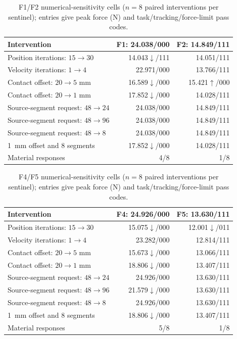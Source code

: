 \begin{table}[t]
\centering
\caption{F1/F2 numerical-sensitivity cells ($n=8$ paired interventions per
sentinel); entries give peak force (N) and task/tracking/force-limit pass codes.}
\label{tab:numerical_cells_f1_f2}
\scriptsize
\setlength{\tabcolsep}{3.2pt}
\renewcommand{\arraystretch}{0.90}
\begin{tabular}{@{}lrr@{}}
\toprule
Intervention & F1: 24.038/000 & F2: 14.849/111 \\
\midrule
Position iterations: $15\rightarrow30$ & 14.043$\downarrow$/111 & 14.051/111 \\
Velocity iterations: $1\rightarrow4$ & 22.971/000 & 13.766/111 \\
Contact offset: $20\rightarrow5$ mm & 16.589$\downarrow$/000 & 15.421$\uparrow$/000 \\
Contact offset: $20\rightarrow1$ mm & 17.852$\downarrow$/000 & 14.028/111 \\
Source-segment request: $48\rightarrow24$ & 24.038/000 & 14.849/111 \\
Source-segment request: $48\rightarrow96$ & 24.038/000 & 14.849/111 \\
Source-segment request: $48\rightarrow8$ & 24.038/000 & 14.849/111 \\
1~mm offset and 8 segments & 17.852$\downarrow$/000 & 14.028/111 \\
\midrule
Material responses & 4/8 & 1/8 \\
\bottomrule
\end{tabular}
\end{table}

\begin{table}[t]
\centering
\caption{F4/F5 numerical-sensitivity cells ($n=8$ paired interventions per
sentinel); entries give peak force (N) and task/tracking/force-limit pass codes.}
\label{tab:numerical_cells_f4_f5}
\scriptsize
\setlength{\tabcolsep}{3.2pt}
\renewcommand{\arraystretch}{0.90}
\begin{tabular}{@{}lrr@{}}
\toprule
Intervention & F4: 24.926/000 & F5: 13.630/111 \\
\midrule
Position iterations: $15\rightarrow30$ & 15.075$\downarrow$/000 & 12.001$\downarrow$/011 \\
Velocity iterations: $1\rightarrow4$ & 23.282/000 & 12.814/111 \\
Contact offset: $20\rightarrow5$ mm & 15.673$\downarrow$/000 & 13.066/111 \\
Contact offset: $20\rightarrow1$ mm & 18.806$\downarrow$/000 & 13.407/111 \\
Source-segment request: $48\rightarrow24$ & 24.926/000 & 13.630/111 \\
Source-segment request: $48\rightarrow96$ & 21.579$\downarrow$/000 & 13.630/111 \\
Source-segment request: $48\rightarrow8$ & 24.926/000 & 13.630/111 \\
1~mm offset and 8 segments & 18.806$\downarrow$/000 & 13.407/111 \\
\midrule
Material responses & 5/8 & 1/8 \\
\bottomrule
\end{tabular}
\end{table}
